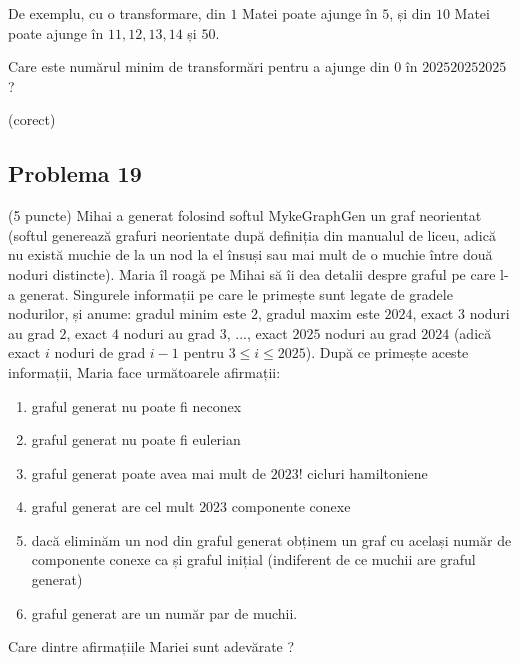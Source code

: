 \documentclass{exam}
\begin{document}
De exemplu, cu o transformare, din $1$ Matei poate ajunge în $5$, și din $10$ Matei poate ajunge în $11, 12, 13, 14$ și $50$. 

Care este numărul minim de transformări pentru a ajunge din $0$ în $202520252025$?



\begin{oneparchoices}
  (corect)
\end{oneparchoices}


\subsection*{Problema 19}

(5 puncte) Mihai a generat folosind softul MykeGraphGen un graf neorientat (softul generează grafuri neorientate după definiția din manualul de liceu, adică nu există muchie de la un nod la el însuși sau mai mult de o muchie între două noduri distincte). Maria îl roagă pe Mihai să îi dea detalii despre graful pe care l-a generat. Singurele informații pe care le primește sunt legate de gradele nodurilor, și anume: gradul minim este $2$, gradul maxim este $2024$, exact $3$ noduri au grad $2$, exact $4$ noduri au grad $3$, ..., exact $2025$ noduri au grad $2024$  (adică exact $i$ noduri de grad $i-1$ pentru $3\le i\le 2025$). După ce primește aceste informații, Maria face următoarele afirmații:
\begin{enumerate}[label=\alph*.]
\item graful generat nu poate fi neconex
\item graful generat nu poate fi  eulerian
\item graful generat poate avea mai mult de $2023!$ cicluri hamiltoniene 
\item graful generat are cel mult $2023$ componente conexe
\item dacă eliminăm un nod din graful generat obținem un graf cu același număr de componente conexe ca și graful inițial (indiferent de ce muchii are graful generat)
\item graful generat are un număr par de muchii.
\end{enumerate}
Care dintre afirmațiile Mariei sunt adevărate ?
\end{document}
